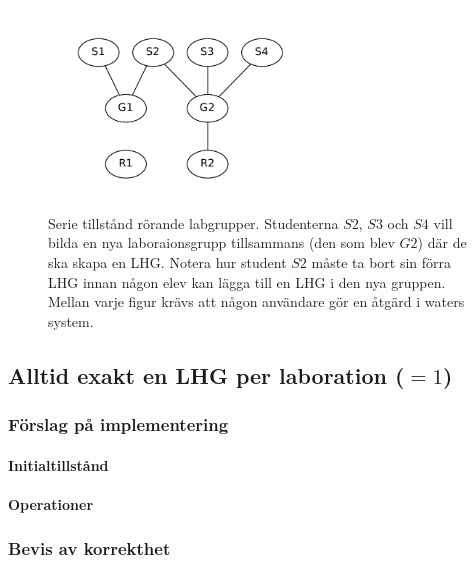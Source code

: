\begin{figure}
  \includegraphics[width=7.0cm]{fig/labgroup/slack_add_5.pdf}        
  \caption[Serie tillstånd rörande labgrupper.]
  {Serie tillstånd rörande labgrupper. Studenterna $S2$, $S3$ och $S4$ vill
  bilda en nya laboraionsgrupp tillsammans (den som blev $G2$) där de ska skapa
  en LHG. Notera hur student $S2$ måste ta bort sin förra LHG innan någon elev
  kan lägga till en LHG i den nya gruppen. Mellan varje figur krävs att någon
  användare gör en åtgärd i waters system.}
  
\end{figure}

\subsection{Alltid exakt en LHG per laboration ($= 1$)}
\subsubsection{Förslag på implementering}
\paragraph{Initialtillstånd}
\paragraph{Operationer}
\subsubsection{Bevis av korrekthet}

